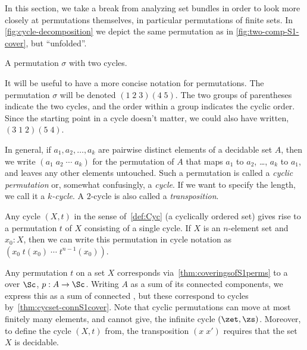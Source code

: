 In this section, we take a break from analyzing set bundles in order to look more closely at permutations themselves, in particular permutations of finite sets.
In \cref{fig:cycle-decomposition} we depict the same permutation as in \cref{fig:two-comp-S1-cover}, but ``unfolded''.
\begin{marginfigure}
  \caption{A permutation $\sigma$ with two cycles.}
  \label{fig:cycle-decomposition}
\end{marginfigure}
It will be useful to have a more concise notation for permutations.
The permutation $\sigma$ will be denoted $(1\;2\;3)(4\;5)$.
The two groups of parentheses indicate the two cycles,
and the order within a group indicates the cyclic order.
Since the starting point in a cycle doesn't matter,
we could also have written, \eg $(3\;1\;2)(5\;4)$.

In general, if $a_1,a_2,\dots,a_k$ are pairwise distinct elements of a decidable set $A$,
then we write $(a_1\;a_2\;\cdots\;a_k)$ for the permutation of $A$
that maps $a_1$ to $a_2$, \ldots, $a_k$ to $a_1$, and leaves any other elements untouched.
Such a permutation is called a \emph{cyclic permutation} or, somewhat confusingly, a \emph{cycle}.
If we want to specify the length, we call it a \emph{$k$-cycle}.
A $2$-cycle is also called a \emph{transposition}.

\begin{remark}\label{rem:cycle-vs-cycle}
  Any cycle $(X,t)$ in the sense of~\cref{def:Cyc} (\ie a cyclically ordered set)
  gives rise to a permutation $t$ of $X$ consisting of a single cycle.
  If $X$ is an $n$-element set and $x_0:X$,
  then we can write this permutation in cycle notation
  as $(x_0\;t(x_0)\;\cdots\;t^{n-1}(x_0))$.

  Any permutation $t$ on a set $X$ corresponds via~\cref{thm:coveringsofS1perms}
  to a \covering over $\Sc$, $p : A \to \Sc$.
  Writing $A$ as a sum of its connected components,
  we express this \covering as a sum of connected \coverings,
  but these correspond to cycles by~\cref{thm:cycset-connS1cover}.
  Note that cyclic permutations can move at most finitely many elements,
  and cannot give, \eg the infinite cycle $(\zet,\zs)$.
  Moreover, to define the cycle $(X,t)$ from,
  \eg the transposition $(x\;x')$ requires that the set $X$ is decidable.
\end{remark}


